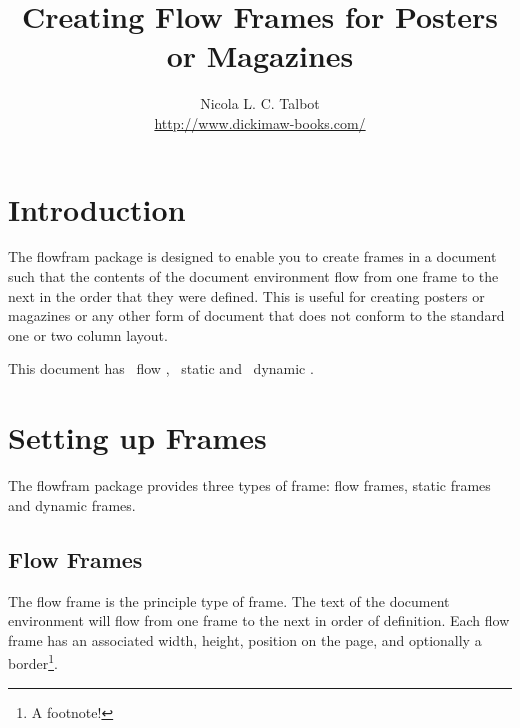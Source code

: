 \documentclass[a4paper,twoside]{book}
\newcommand{\sty}[1]{\textsf{#1}}
\newcommand{\env}[1]{\textsf{#1}}
\begin{document}
\title{Creating Flow Frames for Posters or Magazines}
\author{Nicola L. C. Talbot\\[1cm]\url{http://www.dickimaw-books.com/}}
\date{}
\maketitle

\cleardoublepage

\frontmatter
\tableofcontents

\clearpage
{}

\mainmatter
\enablethumbtabs
\chapter[][Intro]{Introduction}

The \sty{flowfram} package is designed to enable you to create
frames in a document such that the 
contents of the \env{document} environment flow from one 
frame to the next in the order that they were defined.  
This is useful for creating posters
or magazines or any other form of document that does not 
conform to the standard one or two column layout.

This document has \themaxflow\ flow 
, \themaxstatic\ static
 and 
\themaxdynamic\ dynamic .

\chapter[][New Frames]{Setting up Frames}

The \sty{flowfram} package provides three types of frame:
{flow frames}, {static 
frames} and {dynamic frames}.

\section{Flow Frames}

The flow frame is the principle type of frame.
The text of the \env{document} environment will flow from 
one frame to the next in order of definition. Each 
flow frame has an associated width, height, 
position on the page, and optionally a border\footnote{A
footnote!}.
\end{document}
